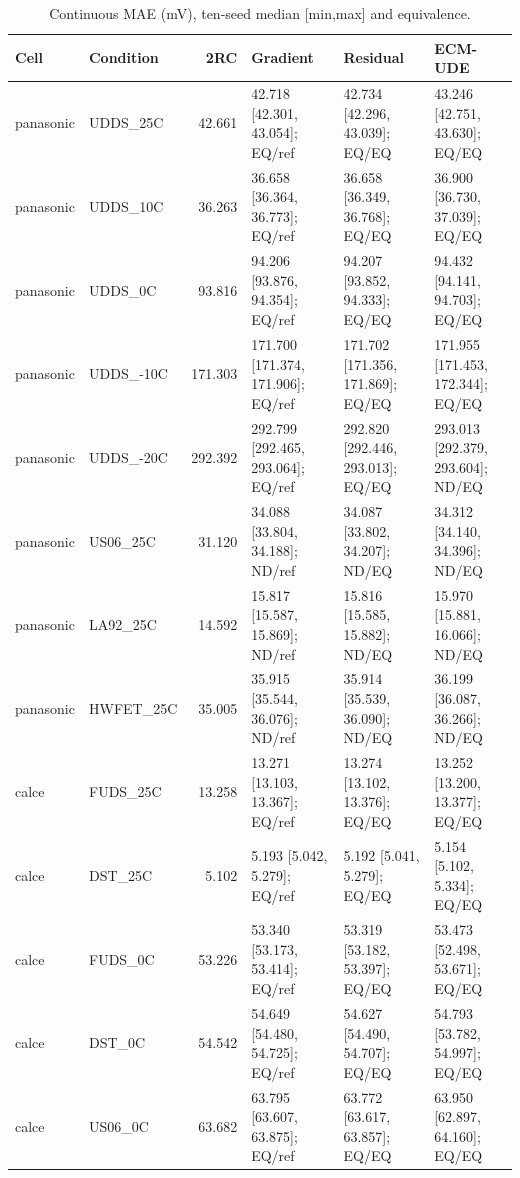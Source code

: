\begin{table}[!t]
\centering
\footnotesize
\caption{Continuous MAE (mV), ten-seed median [min,max] and equivalence.}
\label{tab:reviewer-E1}
\setlength{\tabcolsep}{3pt}
\begin{tabular}{llr p{} p{} p{}}
\toprule
Cell & Condition & 2RC & Gradient & Residual & ECM-UDE \\
\midrule
panasonic & UDDS\_25C & 42.661 & 42.718 [42.301, 43.054]; EQ/ref & 42.734 [42.296, 43.039]; EQ/EQ & 43.246 [42.751, 43.630]; EQ/EQ \\
panasonic & UDDS\_10C & 36.263 & 36.658 [36.364, 36.773]; EQ/ref & 36.658 [36.349, 36.768]; EQ/EQ & 36.900 [36.730, 37.039]; EQ/EQ \\
panasonic & UDDS\_0C & 93.816 & 94.206 [93.876, 94.354]; EQ/ref & 94.207 [93.852, 94.333]; EQ/EQ & 94.432 [94.141, 94.703]; EQ/EQ \\
panasonic & UDDS\_-10C & 171.303 & 171.700 [171.374, 171.906]; EQ/ref & 171.702 [171.356, 171.869]; EQ/EQ & 171.955 [171.453, 172.344]; EQ/EQ \\
panasonic & UDDS\_-20C & 292.392 & 292.799 [292.465, 293.064]; EQ/ref & 292.820 [292.446, 293.013]; EQ/EQ & 293.013 [292.379, 293.604]; ND/EQ \\
panasonic & US06\_25C & 31.120 & 34.088 [33.804, 34.188]; ND/ref & 34.087 [33.802, 34.207]; ND/EQ & 34.312 [34.140, 34.396]; ND/EQ \\
panasonic & LA92\_25C & 14.592 & 15.817 [15.587, 15.869]; ND/ref & 15.816 [15.585, 15.882]; ND/EQ & 15.970 [15.881, 16.066]; ND/EQ \\
panasonic & HWFET\_25C & 35.005 & 35.915 [35.544, 36.076]; ND/ref & 35.914 [35.539, 36.090]; ND/EQ & 36.199 [36.087, 36.266]; ND/EQ \\
calce & FUDS\_25C & 13.258 & 13.271 [13.103, 13.367]; EQ/ref & 13.274 [13.102, 13.376]; EQ/EQ & 13.252 [13.200, 13.377]; EQ/EQ \\
calce & DST\_25C & 5.102 & 5.193 [5.042, 5.279]; EQ/ref & 5.192 [5.041, 5.279]; EQ/EQ & 5.154 [5.102, 5.334]; EQ/EQ \\
calce & FUDS\_0C & 53.226 & 53.340 [53.173, 53.414]; EQ/ref & 53.319 [53.182, 53.397]; EQ/EQ & 53.473 [52.498, 53.671]; EQ/EQ \\
calce & DST\_0C & 54.542 & 54.649 [54.480, 54.725]; EQ/ref & 54.627 [54.490, 54.707]; EQ/EQ & 54.793 [53.782, 54.997]; EQ/EQ \\
calce & US06\_0C & 63.682 & 63.795 [63.607, 63.875]; EQ/ref & 63.772 [63.617, 63.857]; EQ/EQ & 63.950 [62.897, 64.160]; EQ/EQ \\

\end{tabular}
\end{table}
